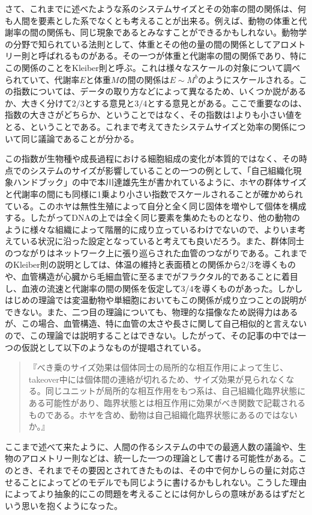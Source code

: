 \documentclass[letterpaper,10pt,english]{sphinxmanual}
\begin{document}
さて、これまでに述べたような系のシステムサイズとその効率の間の関係は、何も人間を要素とした系でなくとも考えることが出来る。例えば、動物の体重と代謝率の間の関係も、同じ現象であるとみなすことができるかもしれない。動物学の分野で知られている法則として、体重とその他の量の間の関係としてアロメトリー則と呼ばれるものがある。その一つが体重と代謝率の間の関係であり、特にこの関係のことをKleiber則と呼ぶ。これは様々なスケールの対象について調べられていて、代謝率\(E\)と体重\(M\)の間の関係は\(E\sim M^{b}\)のようにスケールされる。この指数については、データの取り方などによって異なるため、いくつか説があるか、大きく分けて\(2/3\)とする意見と\(3/4\)とする意見とがある。ここで重要なのは、指数の大きさがどちらか、ということではなく、その指数は1よりも小さい値をとる、ということである。これまで考えてきたシステムサイズと効率の関係について同じ議論であることが分かる。

この指数が生物種や成長過程における細胞組成の変化が本質的ではなく、その時点でのシステムのサイズが影響していることの一つの例として、「自己組織化現象ハンドブック」の中で本川達雄先生が書かれているように、ホヤの群体サイズと代謝率の間にも同様に1乗より小さい指数でスケールされることが確かめられている。このホヤは無性生殖によって自分と全く同じ固体を増やして個体を構成する。したがってDNAの上では全く同じ要素を集めたものとなり、他の動物のように様々な組織によって階層的に成り立っているわけでないので、よりいま考えている状況に沿った設定となっていると考えても良いだろう。また、群体同士のつながりはネットワーク上に張り巡らされた血管のつながりである。これまでのKleiber則の説明としては、体温の維持と表面積との関係から2/3を導くものや、血管構造が心臓から毛細血管に至るまでがフラクタル的であることに着目し、血液の流速と代謝率の間の関係を仮定して3/4を導くものがあった。しかしはじめの理論では変温動物や単細胞においてもこの関係が成り立つことの説明ができない。また、二つ目の理論についても、物理的な描像なため説得力はあるが、この場合、血管構造、特に血管の太さや長さに関して自己相似的と言えないので、この理論では説明することはできない。したがって、その記事の中では一つの仮説として以下のようなものが提唱されている。
\begin{quote}

『べき乗のサイズ効果は個体同士の局所的な相互作用によって生じ、takeover中には個体間の連絡が切れるため、サイズ効果が見られなくなる。同じユニットが局所的な相互作用をもつ系は、自己組織化臨界状態にある可能性があり、臨界状態とは相互作用に効果がべき関数で記載されるものである。ホヤを含め、動物は自己組織化臨界状態にあるのではないか。』
\end{quote}

ここまで述べて来たように、人間の作るシステムの中での最適人数の議論や、生物のアロメトリー則などは、統一した一つの理論として書ける可能性がある。このとき、それまでその要因とされてきたものは、その中で何かしらの量に対応させることによってどのモデルでも同じように書けるかもしれない。こうした理由によってより抽象的にこの問題を考えることには何かしらの意味があるはずだという思いを抱くようになった。
\end{document}
